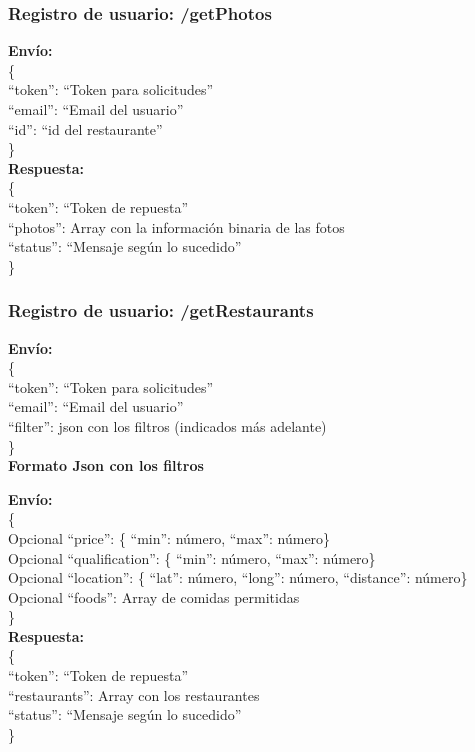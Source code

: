 \documentclass[12pt,letterpaper]{article}
\begin{document}
\subsubsection{Registro de usuario: /getPhotos}
\noindent
\textbf{Envío: }\\
\noindent
\{ \\
``token'': ``Token para solicitudes'' \\
``email'': ``Email del usuario'' \\
``id'': ``id del restaurante''\\
\} \\ 
\noindent
\textbf{Respuesta: }\\
\noindent
\{ \\
``token'': ``Token de repuesta'' \\
``photos'': Array con la información binaria de las fotos\\
``status'': ``Mensaje según lo sucedido'' \\
\}

\subsubsection{Registro de usuario: /getRestaurants}
\noindent
\textbf{Envío: }\\
\noindent
\{ \\
``token'': ``Token para solicitudes'' \\
``email'': ``Email del usuario'' \\
``filter'': json con los filtros (indicados más adelante)\\
\} \\ 

\textbf{Formato Json con los filtros}

\noindent
\textbf{Envío: }\\
\noindent
\{ \\
Opcional ``price'': \{ ``min'': número, ``max'': número\} \\
Opcional ``qualification'': \{ ``min'': número, ``max'': número\} \\
Opcional ``location'': \{ ``lat'': número, ``long'': número, ``distance'': número\} \\
Opcional ``foods'': Array de comidas permitidas \\
\} \\ 

\noindent
\textbf{Respuesta: }\\
\noindent
\{ \\
``token'': ``Token de repuesta'' \\
``restaurants'': Array con los restaurantes\\
``status'': ``Mensaje según lo sucedido'' \\
\}
\end{document}
